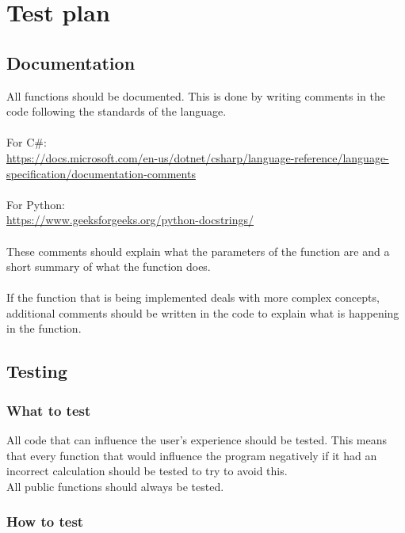 \section{Test plan}

\subsection{Documentation}
All functions should be documented. 
This is done by writing comments in the code following the standards of the language.
\\\\
For C\#: 
\\
\url{https://docs.microsoft.com/en-us/dotnet/csharp/language-reference/language-specification/documentation-comments}
\\\\
For Python:
\\
\url{https://www.geeksforgeeks.org/python-docstrings/}
\\\\
These comments should explain what the parameters of the function are and a short summary of what the function does.
\\\\
If the function that is being implemented deals with more complex concepts, additional comments should be written in the code to explain what is happening in the function.

\subsection{Testing}
\subsubsection{What to test}
All code that can influence the user's experience should be tested. 
This means that every function that would influence the program negatively if it had an incorrect calculation should be tested to try to avoid this.
\\
All public functions should always be tested.

\subsubsection{How to test}

